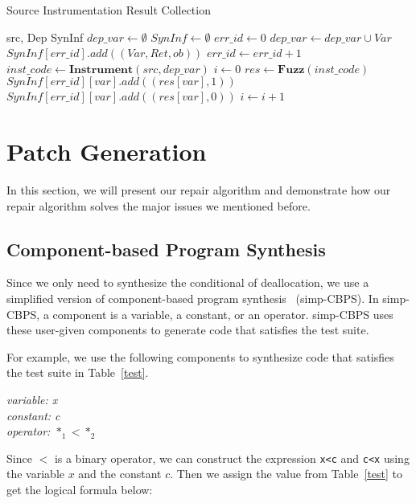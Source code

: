 \documentclass[a4paper,11pt,oneside,openany]{book}
\begin{document}
 \begin{algorithm}[t]
 \caption{Source Instrumentation Result Collection}
 \label{algo1}
 \begin{algorithmic}[1]
 \renewcommand{\algorithmicrequire}{\textbf{Input:}}
 \renewcommand{\algorithmicensure}{\textbf{Output:}}
 \REQUIRE src, Dep
 \ENSURE  SynInf
  \STATE $dep\_var \gets \emptyset$
  \STATE $SynInf \gets \emptyset$
  \STATE $err\_id \gets 0$
   \STATE $dep\_var \gets dep\_var \cup Var$
   \STATE $SynInf[err\_id].add((Var,Ret,ob))$
   \STATE $err\_id \gets err\_id + 1$
  \ENDFOR
  \STATE $inst\_code \gets \textbf{Instrument}(src, dep\_var)$
  \STATE $i \gets 0$
   \STATE $res \gets \textbf{Fuzz}(inst\_code)$
      \STATE $SynInf[err\_id][var].add((res[var],1))$
     \ELSE
      \STATE $SynInf[err\_id][var].add((res[var],0))$
     \ENDIF
     \ENDFOR
    \ENDFOR
   \STATE $i\gets i + 1$
  \ENDWHILE
 \end{algorithmic} 
 \end{algorithm}

\section{Patch Generation}
\label{patchgeneration}

In this section, we will present our repair algorithm and demonstrate how our repair algorithm solves the major issues we mentioned before.


\subsection{Component-based Program Synthesis}
Since we only need to synthesize the conditional of deallocation, we use a simplified version of component-based program synthesis~\cite{oracle} (simp-CBPS). In simp-CBPS, a component is a variable, a constant, or an operator. simp-CBPS uses these user-given components to generate code that satisfies the test suite. 

For example, we use the following components to synthesize code that satisfies the test suite in Table~\ref{test}.


\begin{minipage}{\textwidth}
    \vspace{0.2cm}
    \textsl{\hspace{0.3cm}variable: x\\\hspace{0.3cm}constant: c\\\hspace{0.3cm}operator: $*_1<*_2$\\}
\end{minipage}
Since $<$ is a binary operator, we can construct the expression \verb|x<c| and \verb|c<x| using the variable $x$ and the constant $c$. Then we assign the value from Table~\ref{test} to get the logical formula below:
\end{document}
